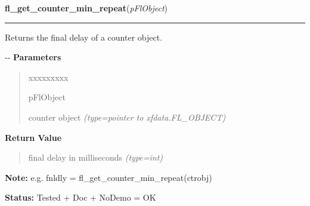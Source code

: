 \hspace{.8\funcindent}\begin{boxedminipage}{\funcwidth}

    \raggedright \textbf{fl\_get\_counter\_min\_repeat}(\textit{pFlObject})

    \vspace{-1.5ex}

    \rule{\textwidth}{0.5\fboxrule}
\setlength{\parskip}{2ex}

Returns the final delay of a counter object.

-{}-
\setlength{\parskip}{1ex}
      \textbf{Parameters}
      \vspace{-1ex}

      \begin{quote}
        \begin{Ventry}{xxxxxxxxx}

          \item[pFlObject]


counter object
            {\it (type=pointer to xfdata.FL\_OBJECT)}

        \end{Ventry}

      \end{quote}

      \textbf{Return Value}
    \vspace{-1ex}

      \begin{quote}

final delay in milliseconds
      {\it (type=int)}

      \end{quote}

\textbf{Note:} 
e.g. fnldly = fl\_get\_counter\_min\_repeat(ctrobj)


\textbf{Status:} 
Tested + Doc + NoDemo = OK


    \end{boxedminipage}

    \label{xformslib:flcounter:fl_set_counter_min_repeat}

    \vspace{0.5ex}

